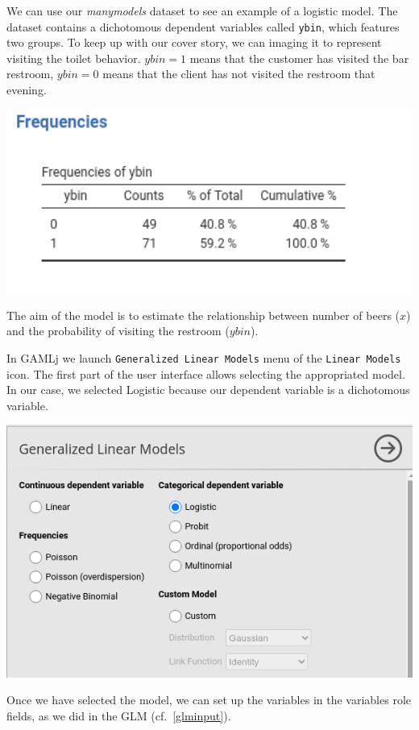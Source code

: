 \documentclass[
]{book}
\begin{document}
We can use our \emph{manymodels} dataset to see an example of a logistic model. The dataset contains a dichotomous dependent variables called \texttt{ybin}, which features two groups. To keep up with our cover story, we can imaging it to represent visiting the toilet behavior. \(ybin=1\) means that the customer has visited the bar restroom, \(ybin=0\) means that the client has not visited the restroom that evening.

\includegraphics[width=5.29in]{bookletpics/3_logistic_freq1}

The aim of the model is to estimate the relationship between number of beers (\(x\)) and the probability of visiting the restroom (\(ybin\)).

In {GAMLj} we launch \texttt{Generalized\ Linear\ Models} menu of the \texttt{Linear\ Models} icon. The first part of the user interface allows selecting the appropriated model. In our case, we selected {Logistic} because our dependent variable is a dichotomous variable.

\includegraphics[width=0.9\linewidth]{bookletpics/3_logistic_input1}

Once we have selected the model, we can set up the variables in the variables role fields, as we did in the GLM (cf.~\ref{glminput}).
\end{document}
